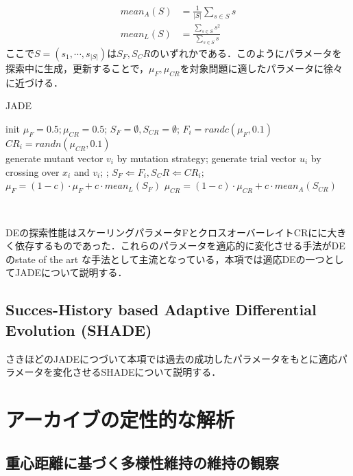 \documentclass[a4paper,11pt,oneside,openany]{jsbook}
\begin{document}
\begin{eqnarray}
  mean_A(S) & = \frac{1}{|S|}\sum_{s\in S}s \\
  mean_L(S) & = \frac{\sum_{s\in S}s^2}{\sum_{s\in S}s}
\end{eqnarray}
ここで$S=(s_1,\cdots, s_{|S|})$は$S_F,S_CR$のいずれかである．このようにパラメータを探索中に生成，更新することで，$\mu _F, \mu _{CR}$を対象問題に適したパラメータに徐々に近づける．

\begin{algorithm}                      
\caption{JADE}         
\label{alg:pbnf}                          
\begin{algorithmic}  
\STATE init $\mu _F = 0.5; \mu _{CR} = 0.5$;
    \STATE $S_F = \emptyset, S_{CR} = \emptyset$;
        \STATE $F_i = randc(\mu _F, 0.1)$ \\
        \STATE $CR_i = randn(\mu _{CR}, 0.1)$ \\
        \STATE generate mutant vector {$v_i$} by mutation strategy;
        \STATE generate trial vector {$u_i$} by crossing over {$x_i$} and {$v_i$}; 
    \ENDFOR
            ;
            \STATE $S_F\Leftarrow {F_i}, S_CR \Leftarrow {CR_i};$
        \ENDIF
    \ENDFOR
        \STATE $\mu_F = (1 - c)\cdot\mu _F + c\cdot mean_L(S_F)$
        \STATE $\mu_{CR} = (1 - c)\cdot\mu _{CR} + c\cdot mean_A(S_{CR})$
    \ENDIF
\ENDWHILE
\end{algorithmic}
\end{algorithm}　

DEの探索性能はスケーリングパラメータFとクロスオーバーレイトCRにに大きく依存するものであった．これらのパラメータを適応的に変化させる手法がDEのstate of the art な手法として主流となっている，本項では適応DEの一つとしてJADEについて説明する．
\section{Succes-History based Adaptive Differential Evolution (SHADE)}
さきほどのJADEにつづいて本項では過去の成功したパラメータをもとに適応パラメータを変化させるSHADEについて説明する．

\chapter{アーカイブの定性的な解析}
\section{重心距離に基づく多様性維持の維持の観察}
\end{document}
